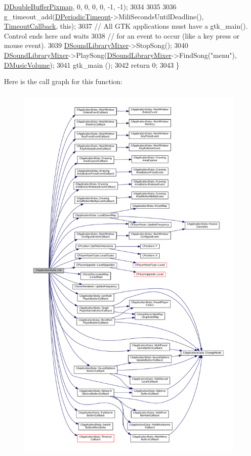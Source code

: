 \begin{DoxyCode}
      \hyperlink{classCApplicationData_aefb64ec5ca3f791f6d431cfc56b9f3b3}{DDoubleBufferPixmap}, 0, 0, 0, 0, -1, -1);
3034     
3035     
3036     g\_timeout\_add(\hyperlink{classCApplicationData_a0265cb7aba9f099faed2a1c8ee588d33}{DPeriodicTimeout}->MiliSecondsUntilDeadline(), 
      \hyperlink{classCApplicationData_af66e15f6935f053b46a11aaa51a869c9}{TimeoutCallback}, \textcolor{keyword}{this});
3037     \textcolor{comment}{// All GTK applications must have a gtk\_main(). Control ends here and waits }
3038     \textcolor{comment}{// for an event to occur (like a key press or mouse event). }
3039     \hyperlink{classCApplicationData_aa1e6876121bb4fb229ec6b930a8a6766}{DSoundLibraryMixer}->StopSong();
3040     \hyperlink{classCApplicationData_aa1e6876121bb4fb229ec6b930a8a6766}{DSoundLibraryMixer}->PlaySong(\hyperlink{classCApplicationData_aa1e6876121bb4fb229ec6b930a8a6766}{DSoundLibraryMixer}->FindSong(\textcolor{stringliteral}{"menu"}), 
      \hyperlink{classCApplicationData_a8bc61af4a83a667102e55cca2a739c3b}{DMusicVolume});
3041     gtk\_main ();
3042     \textcolor{keywordflow}{return} 0;
3043 \}
\end{DoxyCode}
Here is the call graph for this function\+:
\nopagebreak
\begin{figure}[H]
\begin{center}
\leavevmode
\includegraphics[height=550pt]{classCApplicationData_ab757e7ad037decb18cefa3f4ad2e1298_cgraph}
\end{center}
\end{figure}
